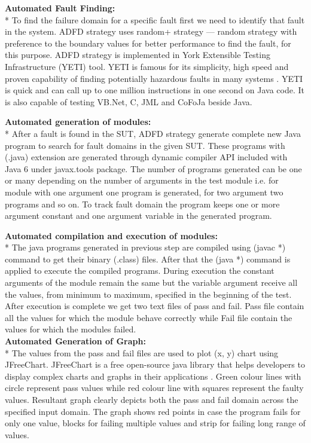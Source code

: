 \documentclass{acm_proc_article-sp}
\begin{document}
\noindent \textbf{Automated Fault Finding:}\\*
\indent To find the failure domain for a specific fault first we need to identify that fault in the system. ADFD strategy uses random+ strategy --- random strategy with preference to the boundary values for better performance to find the fault, for this purpose. ADFD strategy is implemented in York Extensible Testing Infrastructure (YETI) tool. YETI is famous for its simplicity, high speed and proven capability of finding potentially hazardous faults in many systems \cite{Oriol2011, Oriol2012}. YETI is quick and can call up to one million instructions in one second on Java code. It is also capable of testing VB.Net, C, JML and CoFoJa beside Java. 


\noindent \textbf{Automated generation of modules:}\\*
\indent  After a fault is found in the SUT, ADFD strategy generate complete new Java program to search for fault domains in the given SUT.  These programs with (.java) extension are generated through dynamic compiler API included with Java 6 under javax.tools package. The number of programs generated can be one or many depending on the number of arguments in the test module i.e. for module with one argument one program is generated, for two argument two programs and so on. To track fault domain the program keeps one or more argument constant and one argument variable in the generated program.

\noindent \textbf{Automated compilation and execution of modules:}\\*
\indent  The java programs generated in previous step are compiled using (javac *) command to get their binary (.class) files. After that the (java *) command is applied to execute the compiled programs. During execution the constant arguments of the module remain the same but the variable argument receive all the values, from minimum to maximum, specified in the beginning of the test. After execution is complete we get two text files of pass and fail. Pass file contain all the values for which the module behave correctly while Fail file contain the values for which the modules failed.\\

\noindent \textbf{Automated Generation of Graph:}\\*
\indent The values from the pass and fail files are used to plot (x, y) chart using JFreeChart. JFreeChart is a free open-source java library that helps developers to display complex charts and graphs in their applications \cite{Gilbert2008}. Green colour lines with circle represent pass values while red colour line with squares represent the faulty values. Resultant graph clearly depicts both the pass and fail domain across the specified input domain. The graph shows red points in case the program fails for only one value, blocks for failing multiple values and strip for failing long range of values.\\
\end{document}

